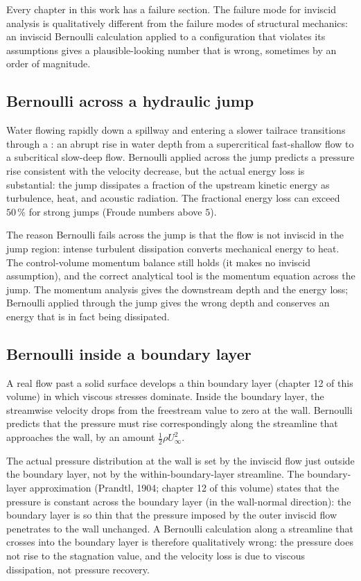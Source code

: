 Every chapter in this work has a failure section. The failure mode
for inviscid analysis is qualitatively different from the failure
modes of structural mechanics: an inviscid Bernoulli calculation
applied to a configuration that violates its assumptions gives a
plausible-looking number that is wrong, sometimes by an order of
magnitude.

\subsection{Bernoulli across a hydraulic jump}

Water flowing rapidly down a spillway and entering a slower
tailrace transitions through a : an abrupt
rise in water depth from a supercritical fast-shallow flow to a
subcritical slow-deep flow. Bernoulli applied across the jump
predicts a pressure rise consistent with the velocity decrease,
but the actual energy loss is substantial: the jump dissipates a
fraction of the upstream kinetic energy as turbulence, heat, and
acoustic radiation. The fractional energy loss can exceed $50\,\%$
for strong jumps (Froude numbers above $5$).

The reason Bernoulli fails across the jump is that the flow is not
inviscid in the jump region: intense turbulent dissipation
converts mechanical energy to heat. The control-volume momentum
balance still holds (it makes no inviscid assumption), and the
correct analytical tool is the momentum equation across the jump.
The momentum analysis gives the downstream depth and the energy
loss; Bernoulli applied through the jump gives the wrong depth
and conserves an energy that is in fact being dissipated.

\subsection{Bernoulli inside a boundary layer}

A real flow past a solid surface develops a thin boundary layer
(chapter 12 of this volume) in which viscous stresses dominate.
Inside the boundary layer, the streamwise velocity drops from the
freestream value to zero at the wall. Bernoulli predicts that the
pressure must rise correspondingly along the streamline that
approaches the wall, by an amount $\tfrac{1}{2}\rho U_\infty^2$.

The actual pressure distribution at the wall is set by the
inviscid flow just outside the boundary layer, not by the
within-boundary-layer streamline. The boundary-layer approximation
(Prandtl, 1904; chapter 12 of this volume) states that the
pressure is constant across the boundary layer (in the wall-normal
direction): the boundary layer is so thin that the pressure
imposed by the outer inviscid flow penetrates to the wall
unchanged. A Bernoulli calculation along a streamline that crosses
into the boundary layer is therefore qualitatively wrong: the
pressure does not rise to the stagnation value, and the velocity
loss is due to viscous dissipation, not pressure recovery.

